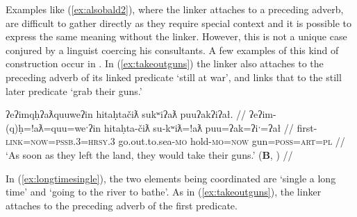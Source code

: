 Examples like (\ref{ex:alsobald2}), where the linker attaches to a preceding adverb, are difficult to gather directly as they require special context and it is possible to express the same meaning without the linker. However, this is not a unique case conjured by a linguist coercing his consultants. A few examples of this kind of construction occur in \citet{sapir1939, sapir1955}. In (\ref{ex:takeoutguns}) the linker also attaches to the preceding adverb of its linked predicate `still at war', and links that to the still later predicate `grab their guns.'

\ex \label{ex:takeoutguns}
\begingl
\glpreamble ʔeʔimqḥʔaƛquuweʔin hitaḥtačiƛ sukʷiʔaƛ puuʔakʔiʔał. //
\gla ʔeʔim-(q)ḥ=!aƛ=quu=weˑʔin hitaḥta-čiƛ su-kʷiƛ=!aƛ puu=ʔak=ʔiˑ=ʔał //
\glb first-\textsc{link}=\textsc{now}=\textsc{pssb.3}=\textsc{hrsy.3} go.out.to.sea-\textsc{mo} hold-\textsc{mo}=\textsc{now} gun=\textsc{poss}=\textsc{art}=\textsc{pl} //
\glft `As soon as they left the land, they would take their guns.' (\textbf{B}, \citet[p.~395]{sapir1955}) //
\endgl
\xe

\begin{comment}
In (\ref{stillatwar}), the linker again attaches to an adverb \textit{ʔiiqḥii} `still', and links the entire predicate `still doing war' to the earlier predicate \textit{qʷis} `do thus.'

\ex \label{stillatwar}
\begingl
\glpreamble qiiḥsn̓aakck̓in ʔaḥ qʷiyiič qʷis, [ʔiiqḥii\textbf{qḥ} hitačink maatmaasʔi] [qaḥsaap̓aƛquuweʔin č̓amuʔałʔaƛquu yuułuʔiłʔatqḥ huuʕiiʔatḥuʔałʔaƛquu]]. //
\gla qiiḥsn̓aak-ck̓in ʔaḥ qʷiyi=(y)ii=č [[qʷis] [ʔiiqḥii-\textbf{(q)ḥ} hitačink maatmaas=ʔiˑ]] qaḥ-saˑp=!aƛ=quu=weˑʔin  č̓am-uʔał=!aƛ=quu yuułuʔiłʔatḥ-(q)ḥ huuʕiiʔatḥ-uʔał=!aƛ=quu. //
\glb long.time-\textsc{dim} \textsc{d1} when=\textsc{weak.3}=\textsc{hrsy} do.thus still-\text{link} go.against tribe.\textsc{pl}=\textsc{art} kill-\textsc{mo.caus}=\textsc{now}=\textsc{pssb.3}=\textsc{hrsy.3} canoe-see=\textsc{now}=\textsc{pssb.3} Ucluelet-\textsc{link} Huuayaht-see=\textsc{pssb.3}=\textsc{hrsy.3} //
\glft `For a little longer after this happened, while the tribes were still at war, the Ucluelets would kill Huu-ay-ahts when they saw their canoes.' (\textbf{B}, \citealt[p.~392]{sapir1955}) //
\endgl
\xe
\end{comment}

In (\ref{ex:longtimesingle}), the two elements being coordinated are `single a long time' and `going to the river to bathe'. As in (\ref{ex:takeoutguns}), the linker attaches to the preceding adverb of the first predicate.

